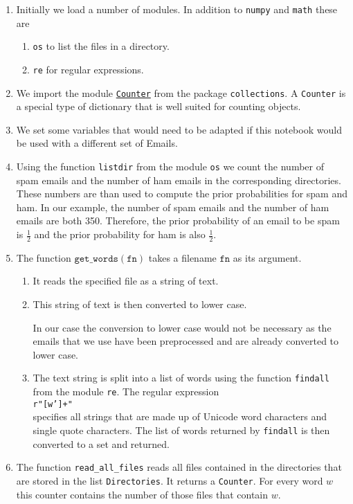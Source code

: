 \begin{enumerate}
\item Initially we load a number of modules.  In addition to \texttt{numpy} and \texttt{math} these are
      \begin{enumerate}
      \item \texttt{os} to list the files in a directory.
      \item \texttt{re} for regular expressions.
      \end{enumerate}
\item We import the module
      \href{https://docs.python.org/2/library/collections.html#counter-objects}{\texttt{Counter}} from the package
      \texttt{collections}.  
      A \texttt{Counter} is a special type of dictionary that is well suited for counting objects.
\item We set some variables that would need to be adapted if this notebook would be used with a different set of
      Emails.
\item Using the function \texttt{listdir} from the module \texttt{os} we count the number of spam emails and
      the number of ham emails in the corresponding directories.  These numbers are than used to compute the
      prior probabilities for spam and ham.  In our example, the number of spam emails and the number of ham
      emails are both 350.  Therefore, the prior probability of an email to be spam is $\frac{1}{2}$ and the
      prior probability for ham is also $\frac{1}{2}$.
\item The function $\texttt{get\_words}(\texttt{fn})$ takes a filename $\texttt{fn}$ as its argument.  
      \begin{enumerate}
      \item It reads the specified file as a string of text.  
      \item This string of text is then converted to lower case.

            In our case the conversion to lower case would not be necessary as the emails that we use
            have been preprocessed and are already converted to lower case.
      \item The text string is split into a list of words using the function \texttt{findall}
            from the module \texttt{re}.  The regular expression
            \\[0.2cm]
            \hspace*{1.3cm}
            \texttt{r"[w']+"}
            \\[0.2cm]
            specifies all strings that are made up of Unicode word characters and single quote characters.
            The list of words returned by \texttt{findall} is then converted to a set and returned.
      \end{enumerate}
\item The function \texttt{read\_all\_files} reads all files contained in the directories that are stored in
      the list \texttt{Directories}.  It returns a \texttt{Counter}.  For every word $w$ this counter contains the number of
      those files that contain $w$.  
      

\end{enumerate}
